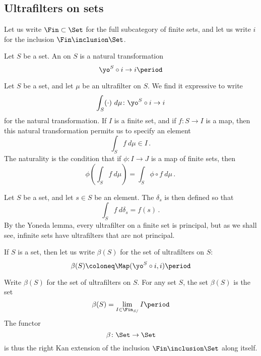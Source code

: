 \subsection{Ultrafilters on sets}%
\label{sub:ultrafilters_on_sets}

\begin{notation}
	Let us write $ \Fin \subset \Set $ for
	the full subcategory of finite sets,
	and let us write $ i $ for
	the inclusion $ \Fin \inclusion \Set $.
\end{notation}

\begin{definition}
	Let $ S $ be a set.
	An  on $ S $ is
	a natural transformation
	\[
		\yo^S \circ i \to i \period
	\]
\end{definition}

\begin{notation}
	Let $ S $ be a set, and
	let $ \mu $ be an ultrafilter on $ S $.
	We find it expressive to write
	\[
		\int_S (\cdot) \ d\mu \colon \yo^S \circ i \to i
	\]
	for the natural transformation.
	If $ I $ is a finite set,
	and if $ f \colon S \to I $ is a map,
	then this natural transformation
	permits us to specify an element
	\[
		\int_S f \ d\mu \in I \period
	\]
	The naturality is the condition that
	if $ \phi \colon I \to J $ is a map of finite sets,
	then
	\[
		\phi \left( \int_S f \ d\mu \right) = 
		\int_S \phi \circ f \ d\mu \period
	\]
\end{notation}

\begin{eg}
	Let $ S $ be a set, and let $ s \in S $ be an element.
	The  $ \delta_s $ is then defined so that
	\[
		\int_S f \ d \delta_s = f(s) \period
	\]
	By the Yoneda lemma,
	every ultrafilter on a finite set is principal,
	but as we shall see,
	infinite sets have ultrafilters that are not principal.
\end{eg}

\begin{notation}
	If $ S $ is a set, then
	let us write $ \beta(S) $ for the set
	of ultrafilters on $ S $:
	\[
		\beta(S) \coloneq \Map(\yo^S \circ i, i) \period
	\]
\end{notation}
	Write $ \beta (S) $ for the set of ultrafilters on $ S $.
	For any set $ S $, the set $ \beta(S) $ is the set
	\[
		\beta(S) = \lim_{I \in \Fin_{S/}} I \period
	\]
	The functor
	\[
		\beta \colon \Set \to \Set
	\]
	is thus the right Kan extension of the inclusion $ \Fin \inclusion \Set $ along itself.

